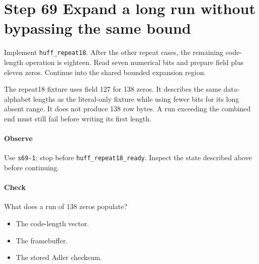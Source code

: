 \section{Step 69 Expand a long run without bypassing the same bound}\label{png-huff-s69}
Implement \texttt{huff\_repeat18}. After the other repeat cases, the remaining code-length operation is eighteen. Read seven numerical bits and prepare field plus eleven zeros. Continue into the shared bounded expansion region.

The repeat18 fixture uses field 127 for 138 zeros. It describes the same data-alphabet lengths as the literal-only fixture while using fewer bits for its long absent range. It does not produce 138 row bytes. A run exceeding the combined end must still fail before writing its first length.

\paragraph{Observe} Use \texttt{s69-1}; stop before \texttt{huff\_repeat18\_ready}. Inspect the state described above before continuing.

\paragraph{Check} What does a run of 138 zeros populate?
\begin{itemize}
  \item[A.] The code-length vector.
  \item[B.] The framebuffer.
  \item[C.] The stored Adler checksum.
\end{itemize}
